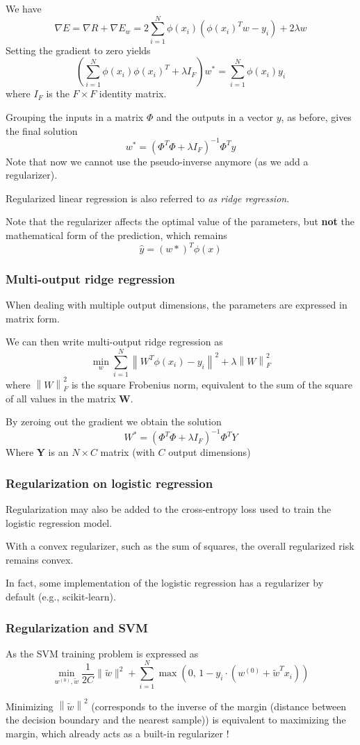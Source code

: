 We have \[ 
  \nabla E = \nabla R + \nabla E_w = 2 \sum_{i=1}^{N}\phi(x_i)(\phi(x_i)^Tw - y_i) + 2 \lambda w 
\]
Setting the gradient to zero yields \[
  \left(\sum_{i=1}^{N}\phi(x_i)\phi(x_i)^T + \lambda I_F\right)w^* = \sum_{i=1}^{N}\phi(x_i)y_i 
\]
where $I_F$ is the $F \times F$ identity matrix. 

Grouping the inputs in a matrix $\Phi$ and the outputs in a vector $y$, as before, gives the final solution \[
  w^* = (\Phi^T \Phi + \lambda I_F)^{-1}\Phi^T y
\]
Note that now we cannot use the pseudo-inverse anymore (as we add a regularizer). 

Regularized linear regression is also referred to \textit{as ridge
regression}.

Note that the regularizer affects the optimal value of the parameters, but \textbf{not}
the mathematical form of the prediction, which remains \[
  \hat{y} = (w*)^T \phi(x)
\]

\subsubsection{Multi-output ridge regression}
When dealing with multiple output dimensions, the
parameters are expressed in matrix form. 

We can then write multi-output ridge regression as \[
\min_w \sum_{i=1}^{N}\left\|W^T \phi(x_i) - y_i\right\|^2 + \lambda \left\|W\right\|_F^2 
\]
where $\left\|W\right\|_F^2$ is the square Frobenius norm, equivalent to the sum of the square of all values in the matrix \textbf{W}.

By zeroing out the gradient we obtain the solution \[
  W^* = \left(\Phi^T \Phi + \lambda I_F\right)^{-1} \Phi^T Y
\]
Where \textbf{Y} is an $N \times C$ matrix (with $C$ output dimensions)

\subsubsection{Regularization on logistic regression}
Regularization may also be added to the cross-entropy loss used to train the logistic regression model. 

With a convex regularizer, such as the sum of squares, the overall
regularized risk remains convex. 

In fact, some implementation of the logistic regression has a regularizer by default (e.g., scikit-learn).

\subsubsection{Regularization and SVM}
As the SVM training problem is expressed as \[
\min_{w^{(0)}, \tilde{w}} \frac{1}{2C} \lVert \tilde{w} \rVert^2 
+ \sum_{i=1}^{N} \max \left(0,\, 1 - y_i \cdot \left(w^{(0)} + \tilde{w}^T x_i \right)\right)
\]

Minimizing $\left\|\tilde{w}\right\|^2$ (corresponds to the inverse of the margin (distance between the
decision boundary and the nearest sample)) is equivalent to maximizing the margin, which already acts as a built-in regularizer !
